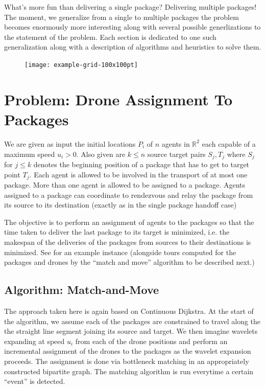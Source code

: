 \documentclass[10pt, english, oneside]{report}
\begin{document}
What's more fun than delivering a single package? Delivering multiple packages! The moment, we generalize 
from a single to multiple packages the problem becomes enormously more interesting along with several 
possible generlizations to the statement of the problem. Each section is dedicated to one such generalization
along with a description of algorithms and heuristics to solve them. 


\begin{figure}[H]
\centering
\texttt{[image: example-grid-100x100pt]}
\end{figure}
\label{fig:multiplepho-assignment}


\section{Problem: Drone Assignment To Packages}
We are given as input the initial locations $P_i$ of $n$  agents in $\mathbb{R}^2$ 
each capable of a maximum speed $u_i >0$.
Also given are $k \leq n$ source target pairs $S_j, T_j$ where $S_j$ for $j \leq k$ 
denotes the beginning position of a package that has to get to target point $T_j$.  
Each agent is allowed to be involved in the transport of at most one package. More 
than one agent is allowed to be assigned to a package. Agents  assigned to a package 
can coordinate to rendezvous and relay the package from its source to its destination 
(exactly as in the single package handoff case)

The objective is to perform an assignment of agents to the packages so that the time 
taken to deliver the last package to its target is minimized, i.e. the makespan of 
the deliveries of the packages from sources to their destinations is minimized.  
See \label{fig:multiplepho-assignment} for an example instance (alongside tours computed
for the packages and drones by the ``match and move'' algorithm to be described next.)

\subsection{Algorithm: Match-and-Move}
\label{ssec:matchmove}

The approach taken here is again based on Continuous Dijkstra. 
At the start of the algorithm, we assume each of the packages 
are constrained to travel along the the straight line segment joining 
its source and target.  We then imagine wavelets expanding at speed $u_i$ 
from each of the drone positions and perform an incremental assignment of the 
drones to the packages as the wavelet expansion proceeds. 
The assignment is done via bottleneck matching in an appropriately 
constructed bipartite graph. The matching algorithm is run everytime 
a certain ``event'' is detected. 
\end{document}
